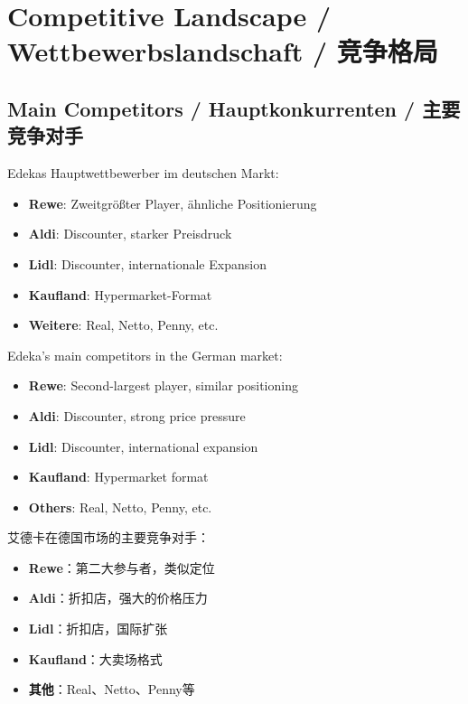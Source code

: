 \chapter{Competitive Landscape / Wettbewerbslandschaft / 竞争格局}

\section{Main Competitors / Hauptkonkurrenten / 主要竞争对手}

\begin{otherlanguage}{ngerman}
Edekas Hauptwettbewerber im deutschen Markt:
\begin{itemize}
    \item \textbf{Rewe}: Zweitgrößter Player, ähnliche Positionierung
    \item \textbf{Aldi}: Discounter, starker Preisdruck
    \item \textbf{Lidl}: Discounter, internationale Expansion
    \item \textbf{Kaufland}: Hypermarket-Format
    \item \textbf{Weitere}: Real, Netto, Penny, etc.
\end{itemize}
\end{otherlanguage}

Edeka's main competitors in the German market:
\begin{itemize}
    \item \textbf{Rewe}: Second-largest player, similar positioning
    \item \textbf{Aldi}: Discounter, strong price pressure
    \item \textbf{Lidl}: Discounter, international expansion
    \item \textbf{Kaufland}: Hypermarket format
    \item \textbf{Others}: Real, Netto, Penny, etc.
\end{itemize}

艾德卡在德国市场的主要竞争对手：
\begin{itemize}
    \item \textbf{Rewe}：第二大参与者，类似定位
    \item \textbf{Aldi}：折扣店，强大的价格压力
    \item \textbf{Lidl}：折扣店，国际扩张
    \item \textbf{Kaufland}：大卖场格式
    \item \textbf{其他}：Real、Netto、Penny等
\end{itemize}


